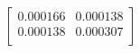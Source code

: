 \begin{equation}
\left[
\begin{array}{cc}
0.000166 & 0.000138 \\
0.000138 & 0.000307 \\
\end{array}
\right]
\end{equation}
